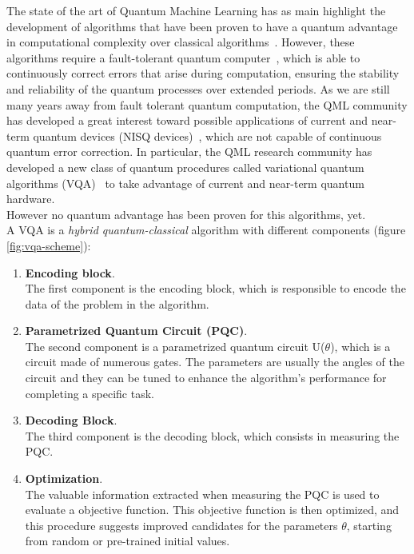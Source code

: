 The state of the art of Quantum Machine Learning has as main highlight the development
of algorithms that have been proven to have a quantum advantage in computational
complexity over classical algorithms~\cite{Sweke_2021, Liu_2021, Jerbi_2021}.
However, these algorithms require a fault-tolerant quantum computer~\cite{shor}, which is able to
continuously correct errors that arise during computation, ensuring the stability and
reliability of the quantum processes over extended periods.
As we are still many years away from fault tolerant quantum computation, the QML
community has developed a great interest toward possible applications of current and
near-term quantum devices (NISQ devices)~\cite{Preskill_2018}, which are not capable of continuous
quantum error correction.
In particular, the QML research community has developed a new class of quantum
procedures called variational quantum algorithms (VQA)~\cite{Cerezo_2021} to take advantage of current
and near-term quantum hardware.\\
However no quantum advantage has been proven for this algorithms, yet.\\

A VQA is a \textit{hybrid quantum-classical} algorithm with different components (figure \ref{fig:vqa-scheme}):

\begin{enumerate}
    \item \textbf{Encoding block}.\\
    The first component is the encoding block, which is responsible to encode the data of the problem in the 
    algorithm.
    \item \textbf{Parametrized Quantum Circuit (PQC)}.\\
    The second component is a parametrized quantum circuit U($\theta$), which is a circuit made of numerous gates. The parameters are usually 
    the angles of the circuit and they can be tuned to enhance the algorithm's performance for completing a specific task. 
    \item \textbf{Decoding Block}.\\
    The third component is the decoding block, which consists in measuring the PQC.
    \item \textbf{Optimization}.\\
    The valuable information extracted when measuring the PQC is used to evaluate a objective function.
    This objective function is then optimized, and this procedure suggests improved candidates 
    for the parameters $\theta$, starting from random or pre-trained initial values.
\end{enumerate}

